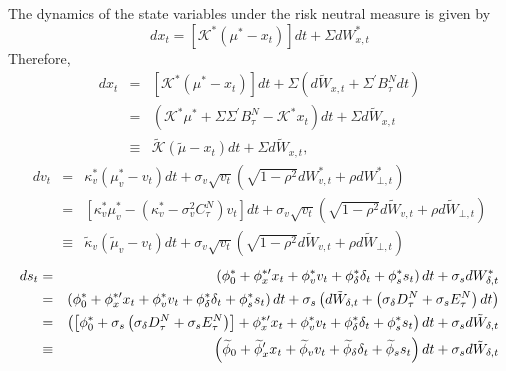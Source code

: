 \documentclass{article}
\begin{document}
The dynamics of the state variables under the risk neutral measure is given
by%
\begin{equation*}
dx_{t}=\left[ \mathcal{K}^{\ast }\left( \mu ^{\ast }-x_{t}\right) \right]
dt+\Sigma dW_{x,t}^{\ast }
\end{equation*}%
Therefore,%
\begin{eqnarray*}
dx_{t} &=&\left[ \mathcal{K}^{\ast }\left( \mu ^{\ast }-x_{t}\right) \right]
dt+\Sigma \left( d\tilde{W}_{x,t}+\Sigma ^{\prime }B_{\tau }^{N}dt\right) \\
&=&\left( \mathcal{K}^{\ast }\mu ^{\ast }+\Sigma \Sigma ^{\prime }B_{\tau
}^{N}-\mathcal{K}^{\ast }x_{t}\right) dt+\Sigma d\tilde{W}_{x,t} \\
&\equiv &\mathcal{\tilde{K}}\left( \tilde{\mu}-x_{t}\right) dt+\Sigma d%
\tilde{W}_{x,t},
\end{eqnarray*}%
\begin{eqnarray*}
dv_{t} &=&\kappa _{v}^{\ast }\left( \mu _{v}^{\ast }-v_{t}\right) dt+\sigma
_{v}\sqrt{v_{t}}\left( \sqrt{1-\rho ^{2}}dW_{v,t}^{\ast }+\rho dW_{\bot
,t}^{\ast }\right) \\
&=&\left[ \kappa _{v}^{\ast }\mu _{v}^{\ast }-\left( \kappa _{v}^{\ast
}-\sigma _{v}^{2}C_{\tau }^{N}\right) v_{t}\right] dt+\sigma _{v}\sqrt{v_{t}}%
\left( \sqrt{1-\rho ^{2}}d\tilde{W}_{v,t}+\rho d\tilde{W}_{\bot ,t}\right) \\
&\equiv &\tilde{\kappa}_{v}\left( \tilde{\mu}_{v}-v_{t}\right) dt+\sigma _{v}%
\sqrt{v_{t}}\left( \sqrt{1-\rho ^{2}}d\tilde{W}_{v,t}+\rho d\tilde{W}_{\bot
,t}\right)
\end{eqnarray*}%
\begin{eqnarray*}
ds_{t} &=&\left( \phi _{0}^{\ast }+\phi _{x}^{\ast \prime }x_{t}+\phi
_{v}^{\ast }v_{t}+\phi _{\delta }^{\ast }\delta _{t}+\phi _{s}^{\ast
}s_{t}\right) dt+\sigma _{s}dW_{\delta ,t}^{\ast } \\
&=&\left( \phi _{0}^{\ast }+\phi _{x}^{\ast \prime }x_{t}+\phi _{v}^{\ast
}v_{t}+\phi _{\delta }^{\ast }\delta _{t}+\phi _{s}^{\ast }s_{t}\right)
dt+\sigma _{s}\left( d\tilde{W}_{\delta ,t}+\left( \sigma _{\delta }D_{\tau
}^{N}+\sigma _{s}E_{\tau }^{N}\right) dt\right) \\
&=&\left( \left[ \phi _{0}^{\ast }+\sigma _{s}\left( \sigma _{\delta
}D_{\tau }^{N}+\sigma _{s}E_{\tau }^{N}\right) \right] +\phi _{x}^{\ast
\prime }x_{t}+\phi _{v}^{\ast }v_{t}+\phi _{\delta }^{\ast }\delta _{t}+\phi
_{s}^{\ast }s_{t}\right) dt+\sigma _{s}d\tilde{W}_{\delta ,t} \\
&\equiv &\left( \widetilde{\phi }_{0}+\widetilde{\phi }_{x}^{\prime }x_{t}+%
\widetilde{\phi }_{v}v_{t}+\widetilde{\phi }_{\delta }\delta _{t}+\widetilde{%
\phi }_{s}s_{t}\right) dt+\sigma _{s}d\tilde{W}_{\delta ,t}
\end{eqnarray*}%
\end{document}
